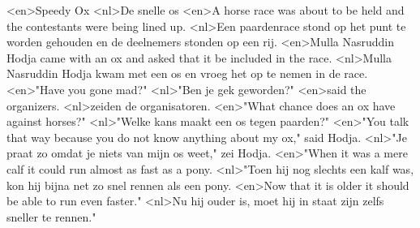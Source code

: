 <en>Speedy Ox 
<nl>De snelle os
<en>A horse race was about to be held and the contestants were being lined up.
<nl>Een paardenrace stond op het punt te worden gehouden en de deelnemers stonden op een rij.
<en>Mulla Nasruddin Hodja came with an ox and asked that it be included in the race.
<nl>Mulla Nasruddin Hodja kwam met een os en vroeg  het op te nemen in de race.
<en>"Have you gone mad?"
<nl>"Ben je gek geworden?"
<en>said the organizers.
<nl>zeiden de organisatoren.
<en>"What chance does an ox have against horses?"
<nl>"Welke kans maakt een os tegen paarden?"
<en>"You talk that way because you do not know anything about my ox," said Hodja.
<nl>"Je praat zo omdat je niets van mijn os weet," zei Hodja.
<en>"When it was a mere calf it could run almost as fast as a pony.
<nl>"Toen hij nog slechts een kalf was, kon hij bijna net zo snel rennen als een pony.
<en>Now that it is older it should be able to run even faster."
<nl>Nu hij ouder is, moet  hij in staat zijn  zelfs sneller te rennen."
